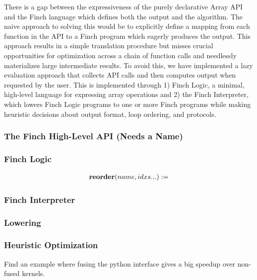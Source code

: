 There is a gap between the expressiveness of the purely declarative Array API and the Finch language which defines both the output and the algorithm. The naive approach to solving this would be to explicitly define a mapping from each function in the API to a Finch program which eagerly produces the output. This approach results in a simple translation procedure but misses crucial opportunities for optimization across a chain of function calls and needlessly materializes large intermediate results. To avoid this, we have implemented a lazy evaluation approach that collects API calls and then computes output when requested by the user. This is implemented through 1) Finch Logic, a minimal, high-level language for expressing array operations and 2) the Finch Interpreter, which lowers Finch Logic programs to one or more Finch programs while making heuristic decisions about output format, loop ordering, and protocols.

\subsubsection{The Finch High-Level API (Needs a Name)}


\subsubsection{Finch Logic}


\begin{align*}
    \text{\textbf{reorder}}(name, idxs...) := 
\end{align*}

\subsubsection{Finch Interpreter}

\subsubsection{Lowering}

\subsubsection{Heuristic Optimization}

Find an example where fusing the python interface gives a big speedup over non-fused kernels.

